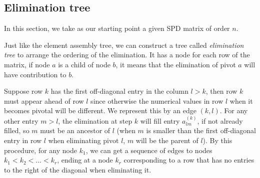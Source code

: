 \subsection{Elimination tree}
In this section, we take as our starting point a given 
SPD matrix of order $n$.

\begin{defn}
    Just like the element assembly tree, we can construct a 
    tree called \textit{elimination tree} to arrange the 
    ordering of the elimination. It has a node for each row of 
    the matrix, if node $a$ is a child of node $b$, it means 
    that the elimination of pivot $a$ will have contribution 
    to $b$.
\end{defn}

\begin{lem}
    \label{lem::emtree}
    Suppose row $k$ has the first off-diagonal entry in the 
    column $l>k$, then row $k$ must appear ahead of row $l$ 
    since otherwise the numerical values in row $l$ when it 
    becomes pivotal will be different. We represent this by an 
    edge $(k,l)$. For any other entry $m>l$, the elimination 
    at step $k$ will fill entry $a_{lm}^{(k)}$, if not already 
    filled, so $m$ must be an ancestor of $l$ (when $m$ is 
    smaller than the first off-diagonal entry in row $l$ when 
    eliminating pivot $l$, $m$ will be the parent of $l$). By 
    this procedure, for any node $k_1$, we can get a sequence 
    of edges to nodes $k_1<k_2<...<k_r$, ending at a node 
    $k_r$ corresponding to a row that has no entries to the 
    right of the diagonal when eliminating it.
\end{lem}

